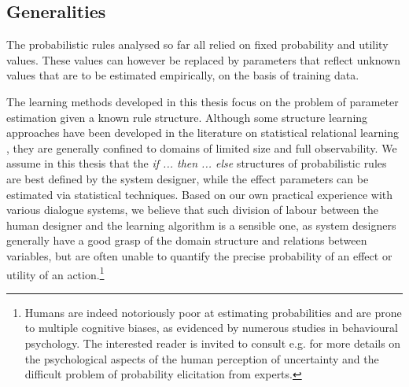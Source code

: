 \subsection{Generalities}

The probabilistic rules analysed so far all relied on fixed probability and utility values. These values can however be replaced by parameters that reflect unknown values that are to be estimated empirically, on the basis of training data. 
 
The learning methods developed in this thesis focus on the problem of parameter estimation given a known rule structure.  Although some structure learning approaches have been developed in the literature on statistical relational learning \citep[see e.g. ][]{PasulaZK07,Kok:2009}, they are generally confined to domains of limited size and full observability. We assume in this thesis that the \textit{if ... then ... else} structures of probabilistic rules are best defined by the system designer, while the effect parameters can be estimated via statistical techniques. Based on our own practical experience with various dialogue systems, we believe that such division of labour between the human designer and the learning algorithm is a sensible one, as system designers generally have a good grasp of the domain structure and relations between variables, but are often unable to quantify the precise probability of an effect or utility of an action.\footnote{Humans are indeed notoriously poor at estimating probabilities and are prone to multiple cognitive biases, as evidenced by numerous studies in behavioural psychology.  The interested reader is invited to consult e.g. \cite{KahnemanSlovicTversky81,morganhenrion} for more details on the psychological aspects of the human perception of uncertainty and the difficult problem of probability elicitation from experts.}

